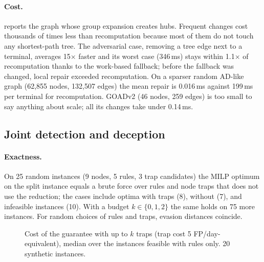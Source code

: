 \documentclass[10pt,twocolumn]{article}
\begin{document}
\paragraph{Cost.}  reports the graph whose group expansion creates hubs.
Frequent changes cost thousands of times less than recomputation because most of them do
not touch any shortest-path tree. The adversarial case, removing a tree edge next to a
terminal, averages 15$\times$ faster and its worst case (346\,ms) stays within
1.1$\times$ of recomputation thanks to the work-based fallback; before the fallback was
changed, local repair exceeded recomputation. On a sparser random AD-like graph (62{,}855
nodes, 132{,}507 edges) the mean repair is 0.016\,ms against 199\,ms per terminal for
recomputation. GOADv2 (46 nodes, 259 edges) is too small to say anything about scale; all
its changes take under 0.14\,ms.

\subsection{Joint detection and deception}

\paragraph{Exactness.} On 25 random instances (9 nodes, 5 rules, 3 trap candidates) the
MILP optimum on the split instance equals a brute force over rules and node traps that
does not use the reduction; the cases include optima with traps (8), without (7), and
infeasible instances (10). With a budget $k\in\{0,1,2\}$ the same holds on 75 more
instances. For random choices of rules and traps, evasion distances coincide.

\begin{figure}[t]
\centering
{}
\caption{Cost of the guarantee with up to $k$ traps (trap cost 5 FP/day-equivalent),
median over the instances feasible with rules only. 20 synthetic instances.}
\label{fig:traps}
\end{figure}
\end{document}
